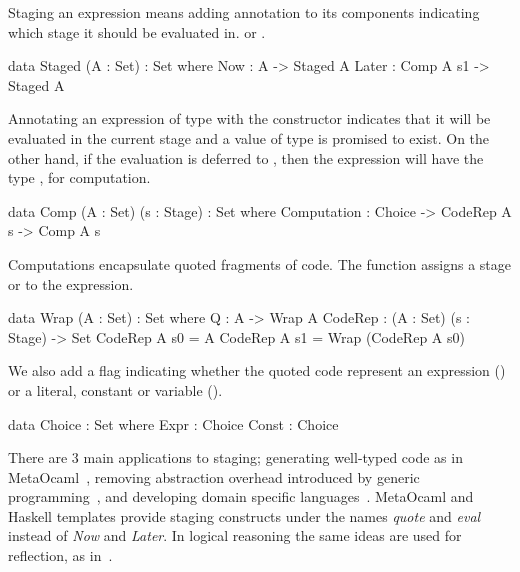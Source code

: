 Staging an expression means adding annotation to its components indicating which stage it should be evaluated in. 
 or . 
\begin{togcode} 
data Staged (A : Set) : Set where
  Now : A -> Staged A
  Later : Comp A s1 -> Staged A
\end{togcode} 
Annotating an expression of type  with the  constructor indicates that it will be evaluated in the current stage and a value of type  is promised to exist. On the other hand, if the evaluation is deferred to , then the expression will have the type , for computation. 
\begin{togcode} 
data Comp (A : Set) (s : Stage) : Set where
  Computation : Choice -> CodeRep A s -> Comp A s
\end{togcode} 
Computations encapsulate quoted fragments of code. The  function assigns a stage  or  to the expression. 
\begin{togcode} 
data Wrap (A : Set) : Set where
  Q : A -> Wrap A
CodeRep : (A : Set) (s : Stage) -> Set
  CodeRep A s0 = A
  CodeRep A s1 = Wrap (CodeRep A s0)
\end{togcode} 
We also add a flag indicating whether the quoted code represent an expression () or a literal, constant or variable ().  
\begin{togcode} 
data Choice : Set where
  Expr : Choice
  Const : Choice
\end{togcode} 

There are $3$ main applications to staging; generating well-typed code as in MetaOcaml~\cite{taha1999multi}, removing abstraction overhead introduced by generic programming~\cite{yallop2016StagingGeneric, carette2011mspFunctorsMonads, carette2011generative}, and developing domain specific languages~\cite{sheard2000stagingDSL}. MetaOcaml and Haskell templates provide staging constructs under the names \emph{quote} and \emph{eval} instead of \emph{Now} and \emph{Later}. In logical reasoning the same ideas are used for reflection, as in~\cite{farmer2013quoteEval}.  



